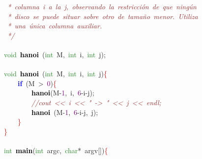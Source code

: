 \mbox{}\textit{\textcolor{Brown}{\ *\ columna\ i\ a\ la\ j,\ observando\ la\ restricción\ de\ que\ ningún}} \\
\mbox{}\textit{\textcolor{Brown}{\ *\ disco\ se\ puede\ situar\ sobre\ otro\ de\ tamaño\ menor.\ Utiliza}} \\
\mbox{}\textit{\textcolor{Brown}{\ *\ una\ única\ columna\ auxiliar.}} \\
\mbox{}\textit{\textcolor{Brown}{\ */}} \\
\mbox{} \\
\mbox{}\textcolor{ForestGreen}{void}\ \textbf{\textcolor{Black}{hanoi}}\ \textcolor{BrickRed}{(}\textcolor{ForestGreen}{int}\ M\textcolor{BrickRed}{,}\ \textcolor{ForestGreen}{int}\ i\textcolor{BrickRed}{,}\ \textcolor{ForestGreen}{int}\ j\textcolor{BrickRed}{);} \\
\mbox{} \\
\mbox{}\textcolor{ForestGreen}{void}\ \textbf{\textcolor{Black}{hanoi}}\ \textcolor{BrickRed}{(}\textcolor{ForestGreen}{int}\ M\textcolor{BrickRed}{,}\ \textcolor{ForestGreen}{int}\ i\textcolor{BrickRed}{,}\ \textcolor{ForestGreen}{int}\ j\textcolor{BrickRed}{)}\textcolor{Red}{\{} \\
\mbox{}\ \ \ \ \textbf{\textcolor{Blue}{if}}\ \textcolor{BrickRed}{(}M\ \textcolor{BrickRed}{\textgreater{}}\ \textcolor{Purple}{0}\textcolor{BrickRed}{)}\textcolor{Red}{\{} \\
\mbox{}\ \ \ \ \ \ \ \ \textbf{\textcolor{Black}{hanoi}}\textcolor{BrickRed}{(}M\textcolor{BrickRed}{-}\textcolor{Purple}{1}\textcolor{BrickRed}{,}\ i\textcolor{BrickRed}{,}\ \textcolor{Purple}{6}\textcolor{BrickRed}{-}i\textcolor{BrickRed}{-}j\textcolor{BrickRed}{);} \\
\mbox{}\ \ \ \ \ \ \ \ \textit{\textcolor{Brown}{//cout\ \textless{}\textless{}\ i\ \textless{}\textless{}\ "{}\ -\textgreater{}\ "{}\ \textless{}\textless{}\ j\ \textless{}\textless{}\ endl;}} \\
\mbox{}\ \ \ \ \ \ \ \ \textbf{\textcolor{Black}{hanoi}}\ \textcolor{BrickRed}{(}M\textcolor{BrickRed}{-}\textcolor{Purple}{1}\textcolor{BrickRed}{,}\ \textcolor{Purple}{6}\textcolor{BrickRed}{-}i\textcolor{BrickRed}{-}j\textcolor{BrickRed}{,}\ j\textcolor{BrickRed}{);} \\
\mbox{}\ \ \ \ \textcolor{Red}{\}} \\
\mbox{}\textcolor{Red}{\}} \\
\mbox{} \\
\mbox{}\textcolor{ForestGreen}{int}\ \textbf{\textcolor{Black}{main}}\textcolor{BrickRed}{(}\textcolor{ForestGreen}{int}\ argc\textcolor{BrickRed}{,}\ \textcolor{ForestGreen}{char}\textcolor{BrickRed}{*}\ argv\textcolor{BrickRed}{[])}\textcolor{Red}{\{} \\
